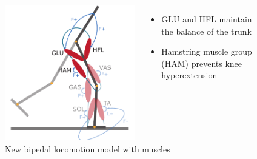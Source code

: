 \documentclass[10pt]{beamer}
\begin{document}
\begin{frame}
\begin{figure}
\begin{overprint}
			\begin{columns}
				\begin{column}{.5\textwidth}
					\includegraphics[height=.5\textheight]{images/new_model/stance/muscle_vas_sol_gas_ta_ham_glu_hfl_floor.pdf} 
					\caption{New bipedal locomotion model with muscles}
				\end{column}
				\begin{column}{.5\textwidth}
					\begin{itemize}
							\item GLU and HFL maintain the balance of the trunk  \\ [1em]
							\item Hamstring muscle group (HAM) prevents knee hyperextension
					\end{itemize}
				\end{column}
			\end{columns}	
		\end{overprint}			
	\end{figure}

\end{frame}
\end{document}
